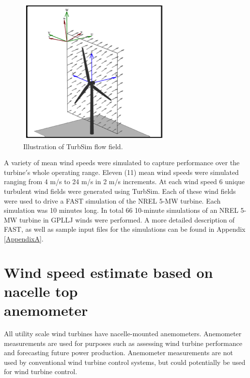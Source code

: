 \begin{figure}[htbp]
	\centering
		\includegraphics[width=.5\linewidth]{Figures/ch2Figures/fig2-2.png}
		
	\caption{Illustration of TurbSim flow field.\cite{jonkman2012}}
	\label{fig2-2}
\end{figure}

A variety of mean wind speeds were simulated to capture performance over the turbine$'$s whole operating range. Eleven (11) mean wind speeds were simulated ranging from 4 m/s to 24 m/s in 2 m/s increments. At each wind speed 6 unique turbulent wind fields were generated using TurbSim. Each of these wind fields were used to drive a FAST simulation of the NREL 5-MW turbine. Each simulation was 10 minutes long. In total 66 10-minute simulations of an NREL 5-MW turbine in GPLLJ winds were performed.  A more detailed description of FAST, as well as sample input files for the simulations can be found in Appendix \ref{AppendixA}.






\section{Wind speed estimate based on nacelle top \\
anemometer}\label{section2-3}

All utility scale wind turbines have nacelle-mounted anemometers. Anemometer measurements are used for purposes such as assessing wind turbine performance and forecasting future power production. Anemometer measurements are not used by conventional wind turbine control systems, but could potentially be used for wind turbine control.

